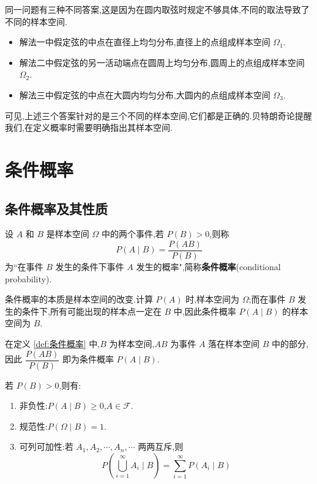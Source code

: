 \begin{note}
    \indent 同一问题有三种不同答案,这是因为在圆内取弦时规定不够具体,不同的取法导致了不同的样本空间.

    \begin{itemize}
        \item 解法一中假定弦的中点在直径上均匀分布,直径上的点组成样本空间 $\varOmega_1$.
        \item 解法二中假定弦的另一活动端点在圆周上均匀分布,圆周上的点组成样本空间 $\varOmega_2$.
        \item 解法三中假定弦的中点在大圆内均匀分布,大圆内的点组成样本空间 $\varOmega_3$.
    \end{itemize}

    可见,上述三个答案针对的是三个不同的样本空间,它们都是正确的.贝特朗奇论提醒我们,在定义概率时需要明确指出其样本空间.
\end{note}

\section{条件概率}

\subsection{条件概率及其性质}

\begin{definition}
    \indent 设 $A$ 和 $B$ 是样本空间 $\varOmega$ 中的两个事件,若 $P(B)>0$,则称
    $$
    P(A \mid B) = \dfrac{P(AB)}{P(B)}
    $$
    为``在事件 $B$ 发生的条件下事件 $A$ 发生的概率",简称\textbf{条件概率}(conditional probability).
\end{definition}

\begin{note}
    \indent 条件概率的本质是样本空间的改变.计算 $P(A)$ 时,样本空间为 $\varOmega$;而在事件 $B$ 发生的条件下,所有可能出现的样本点一定在 $B$ 中,因此条件概率 $P(A \mid B)$ 的样本空间为 $B$.

    在定义 \ref{def:条件概率} 中,$B$ 为样本空间,$AB$ 为事件 $A$ 落在样本空间 $B$ 中的部分,因此 $\dfrac{P(AB)}{P(B)}$ 即为条件概率 $P(A \mid B)$.
\end{note}

\begin{property}
    \indent 若 $P(B) > 0$,则有:
    \begin{enumerate}
        \item 非负性:$P(A \mid B) \geqslant 0$,$A \in \mathcal{F}$.
        \item 规范性:$P(\varOmega \mid B) = 1$.
        \item 可列可加性:若 $A_1, A_2, \cdots, A_n, \cdots$ 两两互斥,则
        $$
        P \left( \bigcup_{i=1}^{\infty} A_i \mid B \right) = \sum_{i=1}^{\infty} P(A_i \mid B)
        $$
    \end{enumerate}
\end{property}

